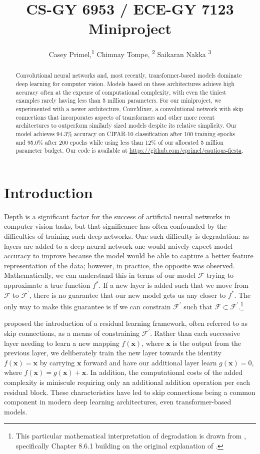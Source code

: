 \documentclass[letterpaper]{article} %
\title{CS-GY 6953 / ECE-GY 7123 Miniproject}
\author {
    Casey Primel,\textsuperscript{\rm 1}
    Chimnay Tompe, \textsuperscript{\rm 2}
    Saikaran Nakka \textsuperscript{\rm 3}
}
\begin{document}
\maketitle

\begin{abstract}
Convolutional neural networks and, most recently, transformer-based models dominate deep learning for computer vision. Models based on these architectures achieve high accuracy often at the expense of computational complexity, with even the tiniest examples rarely having less than 5 million parameters. For our miniproject, we experimented with a newer architecture, ConvMixer, a convolutional network with skip connections that incorporates aspects of transformers and other more recent architectures to outperform similarly sized models despite its relative simplicity. Our model achieves 94.3\% accuracy on CIFAR-10 classification after 100 training epochs and 95.0\% after 200 epochs while using less than 12\% of our allocated 5 million parameter budget. Our code is available at \url{https://github.com/cprimel/cautious-fiesta}.
\end{abstract}

\section{Introduction}

Depth is a significant factor for the success of artificial neural networks in computer vision tasks, but that significance has often confounded by the difficulties of training such deep networks. One such difficulty is degradation: as layers are added to a deep neural network one would naively expect model accuracy to improve because the model would be able to capture a better feature representation of the data; however, in practice, the opposite was observed. Mathematically, we can understand this in terms of our model $\mathcal{F}$ trying to approximate a true function $f^*$. If a new layer is added such that we move from $\mathcal{F}$ to $\mathcal{F}^\prime$, there is no guarantee that our new model gets us any closer to $f^*$. The only way to make this guarantee is if we can constrain $\mathcal{F}^\prime$ such that $\mathcal{F} \subset \mathcal{F}^\prime$.\footnote{This particular mathematical interpretation of degradation is drawn from \citet{Zhang2021}, specifically Chapter 8.6.1 building on the original explanation of \citet{He2015}.}

\citet{He2015} proposed the introduction of a residual learning framework, often referred to as skip connections, as a means of constraining $\mathcal{F}^\prime$. Rather than each successive layer needing to learn a new mapping $f(\mathbf{x})$, where $\mathbf{x}$ is the output from the previous layer, we deliberately train the new layer towards the identity $f(\mathbf{x})=\mathbf{x}$ by carrying $\mathbf{x}$ forward and have our additional layer learn $g(\mathbf{x}) = 0$, where $f(\mathbf{x})= g(\mathbf{x}) + \mathbf{x}$. In addition, the computational costs of the added complexity is miniscule requiring only an additional addition operation per each residual block. These characteristics have led to skip connections being a common component in modern deep learning architectures, even transformer-based models. 
\end{document}
